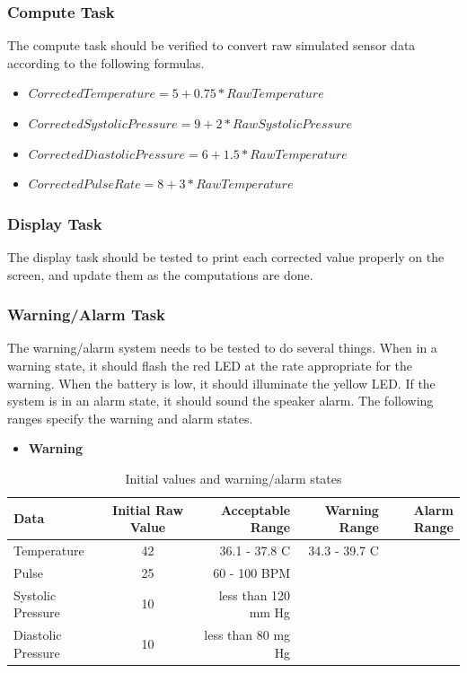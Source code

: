 \documentclass[12pt]{article} %
\begin{document}
\subsubsection{Compute Task}
The compute task should be verified to convert raw simulated sensor data according to the following formulas.
\begin{itemize}
  \item $CorrectedTemperature = 5 + 0.75 * RawTemperature$
  \item $CorrectedSystolicPressure = 9 + 2 * RawSystolicPressure$
  \item $CorrectedDiastolicPressure = 6 + 1.5 * RawTemperature$
  \item $CorrectedPulseRate = 8 + 3 * RawTemperature$
\end{itemize}

\subsubsection{Display Task}
The display task should be tested to print each corrected value properly on the screen, and update them as the computations are done.

\subsubsection{Warning/Alarm Task} The warning/alarm system needs to be tested
to do several things.  When in a warning state, it should flash the red LED at
the rate appropriate for the warning.  When the battery is low, it should
illuminate the yellow LED.  If the system is in an alarm state, it should sound
the speaker alarm.  The following ranges specify the warning and alarm states.
\begin{itemize} \item \textbf{Warning}
  \end{itemize}

\begin{table}[h]
	\centering
	\begin{tabular}{lcrrr} 
    \toprule
		Data & Initial Raw Value & Acceptable Range & Warning Range & Alarm Range \\
		\midrule
		Temperature & 42 & 36.1 - 37.8 C & 34.3 - 39.7 C& \\
		Pulse & 25 & 60 - 100 BPM & & \\
		Systolic Pressure  & 10 & less than 120 mm Hg & & \\
		Diastolic Pressure & 10 & less than 80 mg Hg & & \\
    \bottomrule
	\end{tabular}
	\caption{Initial values and warning/alarm states}
  \label{tab:ranges}
\end{table}
\end{document}
